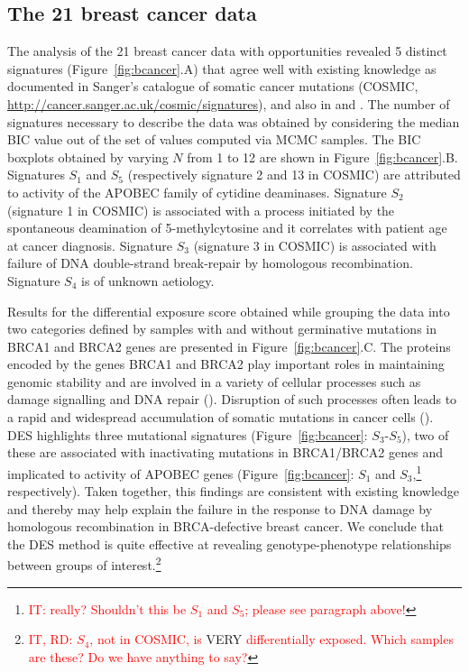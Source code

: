 \documentclass{bioinfo}
\begin{document}
\subsection{The 21 breast cancer data}
The analysis of the 21 breast cancer data with opportunities revealed
5 distinct signatures (Figure~\ref{fig:bcancer}.A) that agree well
with existing knowledge as documented in Sanger's catalogue of
somatic cancer mutations (COSMIC, 
\url{http://cancer.sanger.ac.uk/cosmic/signatures}), and also in
\cite{HEN} and \cite{ANat}. The number of signatures necessary to
describe the data was obtained by considering the median BIC value out
of the set of values computed via MCMC samples. The BIC boxplots
obtained by varying $N$ from 1 to 12 are shown in
Figure~\ref{fig:bcancer}.B. Signatures $S_1$ and $S_5$ (respectively
signature 2 and 13 in COSMIC) are attributed to activity of the APOBEC
family of cytidine deaminases.  Signature $S_2$ (signature 1 in
COSMIC) is associated with a process initiated by the spontaneous
deamination of 5-methylcytosine and it correlates with patient age at
cancer diagnosis. Signature $S_3$ (signature 3 in COSMIC) is
associated with failure of DNA double-strand break-repair by
homologous recombination. Signature $S_4$ is of unknown aetiology. 


Results for the differential exposure score obtained while grouping
the data into two categories defined by samples with and without
germinative mutations in BRCA1 and BRCA2 genes are presented in
Figure~\ref{fig:bcancer}.C. The proteins encoded by the genes BRCA1
and BRCA2 play important roles in maintaining genomic stability and
are involved in a variety of cellular processes such as damage
signalling and DNA repair (\citealp{LY}). Disruption of such processes
often leads to a rapid and widespread accumulation of somatic
mutations in cancer cells (\citealp{Ash}). DES highlights three
mutational signatures (Figure~\ref{fig:bcancer}: $S_3$-$S_5$), two of
these are associated with inactivating mutations in BRCA1/BRCA2 genes
and implicated to activity of APOBEC genes (Figure~\ref{fig:bcancer}:
$S_1$ and $S_3$,\footnote{\textcolor{red}{IT: really? Shouldn't this
be $S_1$ and $S_5$; please see paragraph above!}} respectively). Taken
together, this findings are consistent with existing knowledge and
thereby may help explain the failure in the response to DNA damage by
homologous recombination in BRCA-defective breast cancer. We conclude
that the DES method is quite effective at revealing genotype-phenotype
relationships between groups of interest.\footnote{\textcolor{red}{IT,
    RD: $S_4$, not in COSMIC, is} VERY \textcolor{red}{differentially
    exposed. Which samples are these? Do we have anything to say?}} 
\end{document}
